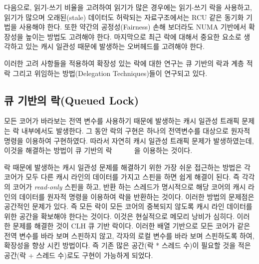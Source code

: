 다음으로, 읽기-쓰기 비율을 고려하여 읽기가 많은 경우에는 읽기-쓰기 락을 사용하고,
읽기가 많으며 오래된(stale) 데이터도 허락되는 자료구조에서는 RCU 같은 동기화 기법을 사용해야 한다.  
또한 약간의 공정성(Fairness) 손해 보더라도 NUMA 기반에서 확장성을 높이는 방법도 고려해야 한다.
마지막으로 최근 락에 대해서 중요한 요소로 생각하고 있는 캐시 일관성 때문에 발생하는 
오버헤드를 고려해야 한다. 


%


이러한 고려 사항들을 적용하여 확장성 있는 락에 대한 연구는 큐 기반의
락과 계층 적 락 그리고 위임하는 방법(Delegation Techniques)들이 연구되고 있다. 

\subsection{큐 기반의 락(Queued Lock)}
모든 코어가 바라보는 전역 변수를 사용하기 때문에 발생하는 캐시 일관성 트래픽 문제는 
락 내부에서도 발생한다. 
그 동안 락의 구현은 하나의 전역변수를 대상으로 원자적 명령을 이용하여 구현하였다. 
따라서 자연히 캐시 일관성 트래픽 문제가 발생하였는데, 이것을 해결하는 방법이 큐 기반의 락
~\cite{MellorCrummey1991MCS}~\cite{Magnusson1994QLC}~\cite{Wang2016BeMyGuest}~\cite{Scott2013SS}
~\cite{Bueso2014MCS}을 이용하는 것이다. 

락 때문에 발생하는 캐시 일관성 문제를 해결하기 위한 가장 쉬운 접근하는 방법은 각 
코어가 모두 다른 캐시 라인의 데이터를 가지고 스핀을 하면 쉽게 해결이 된다.
즉 각각의 코어가 \textit{read-only} 스핀을 하고, 반환 하는 스레드가 명시적으로 해당 코어의 캐시 라인의 데이터를 
원자적 명령을 이용하여 락을 반환하는 것이다. 
이러한 방법의 문제점은 공간적인 문제가 있다. 
즉 모든 락이 모든 코어의 중복되지 않도록 캐시 라인 데이터를 위한 공간을 확보해야 한다는 것이다.
이것은 현실적으로 메모리 낭비가 심히다.
이러한 문제를 해결한 것이 CLH 큐 기반 락이다. 
이러한 배열 기반으로 모든 코어가 같은 전역 변수를 바라 보며 스핀하지 않고, 
각자의 로컬 변수를 바라 보며 스핀하도록 하여, 확장성을 향상 시킨 방법이다. 
즉 기존 많은 공간(락 * 스레드 수)이 필요할 것을 적은 공간(락 + 스레드 수)로도 구현이 가능하게 되었다.

